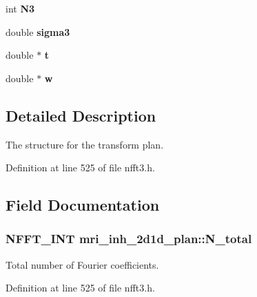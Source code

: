 \begin{DoxyCompactItemize}
\item 
\hypertarget{structmri__inh__2d1d__plan_a9776bd2e03278b7cbdef2b4dce19dbc1}{int {\bfseries N3}}\label{structmri__inh__2d1d__plan_a9776bd2e03278b7cbdef2b4dce19dbc1}

\item 
\hypertarget{structmri__inh__2d1d__plan_a94c6285d9cfeb7e358dd4990245639e7}{double {\bfseries sigma3}}\label{structmri__inh__2d1d__plan_a94c6285d9cfeb7e358dd4990245639e7}

\item 
\hypertarget{structmri__inh__2d1d__plan_ae80cae06faca26a12bbbb896d5d7c527}{double $\ast$ {\bfseries t}}\label{structmri__inh__2d1d__plan_ae80cae06faca26a12bbbb896d5d7c527}

\item 
\hypertarget{structmri__inh__2d1d__plan_a22ed3402646ded705084299c84d97a62}{double $\ast$ {\bfseries w}}\label{structmri__inh__2d1d__plan_a22ed3402646ded705084299c84d97a62}

\end{DoxyCompactItemize}


\subsection{Detailed Description}
The structure for the transform plan. 

Definition at line 525 of file nfft3.\-h.



\subsection{Field Documentation}
\hypertarget{structmri__inh__2d1d__plan_a05e40914ac74d6cececb2a7c76cd735e}{
\subsubsection[{N\-\_\-total}]{\setlength{\rightskip}{0pt plus 5cm}N\-F\-F\-T\-\_\-\-I\-N\-T mri\-\_\-inh\-\_\-2d1d\-\_\-plan\-::\-N\-\_\-total}}\label{structmri__inh__2d1d__plan_a05e40914ac74d6cececb2a7c76cd735e}


Total number of Fourier coefficients. 



Definition at line 525 of file nfft3.\-h.



